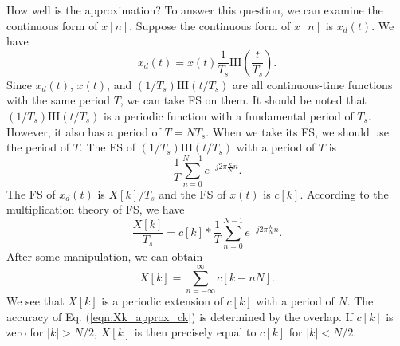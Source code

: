 \documentclass[journal,twoside]{IEEEtran}
\begin{document}
How well is the approximation? To answer this question, we can examine the continuous form of $x[n]$. Suppose the continuous form of $x[n]$ is $x_d(t)$. We have
\begin{equation}
x_d(t) = x(t)\frac{1}{T_s}\mathrm{III}(\frac{t}{T_s}).
\end{equation}
Since $x_d(t)$, $x(t)$, and $({1}/{T_s})\mathrm{III}({t}/{T_s})$ are all continuous-time functions with the same period $T$, we can take FS on them. It should be noted that $({1}/{T_s})\mathrm{III}({t}/{T_s})$ is a periodic function with a fundamental period of $T_s$. However, it also has a period of $T = N T_s$. When we take its FS, we should use the period of $T$. The FS of $({1}/{T_s})\mathrm{III}({t}/{T_s})$ with a period of $T$ is
\begin{equation*}
\frac{1}{T}\sum_{n=0}^{N-1}e^{-j 2\pi \frac{k}{N} n}.
\end{equation*}
The FS of $x_d(t)$ is $X[k]/T_s$ and the FS of $x(t)$ is $c[k]$. According to the multiplication theory of FS, we have
\begin{equation}
\frac{X[k]}{T_s} = c[k] * \frac{1}{T}\sum_{n=0}^{N-1}e^{-j 2\pi \frac{k}{N} n}.
\end{equation}
After some manipulation, we can obtain
\begin{equation}
X[k] = \sum_{n=-\infty}^{\infty}c[k-n N].
\end{equation}
We see that $X[k]$ is a periodic extension of $c[k]$ with a period of $N$. The accuracy of Eq. (\ref{eqn:Xk_approx_ck}) is determined by the overlap. If $c[k]$ is zero for $|k|>N/2$, $X[k]$ is then precisely equal to $c[k]$ for $|k| < N/2$. 
\end{document}
